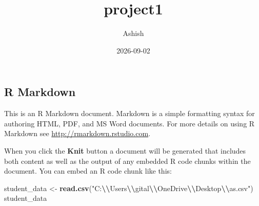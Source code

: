 \documentclass[
]{article}
\title{project1}
\author{Ashish}
\date{2026-09-02}
\newenvironment{Shaded}{\begin{snugshade}}{\end{snugshade}}
\newcommand{\FunctionTok}[1]{\textcolor[rgb]{0.13,0.29,0.53}{\textbf{#1}}}
\newcommand{\NormalTok}[1]{#1}
\newcommand{\OtherTok}[1]{\textcolor[rgb]{0.56,0.35,0.01}{#1}}
\newcommand{\SpecialCharTok}[1]{\textcolor[rgb]{0.81,0.36,0.00}{\textbf{#1}}}
\newcommand{\StringTok}[1]{\textcolor[rgb]{0.31,0.60,0.02}{#1}}
\begin{document}
\maketitle

\subsection{R Markdown}\label{r-markdown}

This is an R Markdown document. Markdown is a simple formatting syntax
for authoring HTML, PDF, and MS Word documents. For more details on
using R Markdown see \url{http://rmarkdown.rstudio.com}.

When you click the \textbf{Knit} button a document will be generated
that includes both content as well as the output of any embedded R code
chunks within the document. You can embed an R code chunk like this:

\begin{Shaded}
\begin{Highlighting}[]
\NormalTok{student\_data }\OtherTok{\textless{}{-}} \FunctionTok{read.csv}\NormalTok{(}\StringTok{"C:}\SpecialCharTok{\textbackslash{}\textbackslash{}}\StringTok{Users}\SpecialCharTok{\textbackslash{}\textbackslash{}}\StringTok{gital}\SpecialCharTok{\textbackslash{}\textbackslash{}}\StringTok{OneDrive}\SpecialCharTok{\textbackslash{}\textbackslash{}}\StringTok{Desktop}\SpecialCharTok{\textbackslash{}\textbackslash{}}\StringTok{as.csv"}\NormalTok{) }
\NormalTok{student\_data}
\end{Highlighting}
\end{Shaded}
\end{document}
